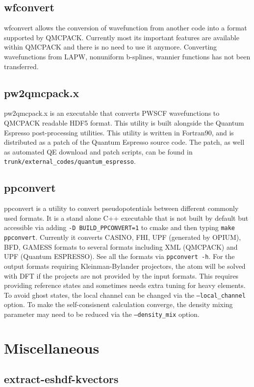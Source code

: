   \subsection{wfconvert}
    wfconvert allows the conversion of wavefunction from another code into a format supported by QMCPACK.
    Currently most its important features are available within QMCPACK and there is no need to use it anymore.
    Converting wavefunctions from LAPW, nonuniform b-splines, wannier functions has not been transferred.
  \subsection{pw2qmcpack.x}
    pw2qmcpack.x is an executable that converts PWSCF wavefunctions to QMCPACK readable 
    HDF5 format.  This utility is built alongside the Quantum Espresso post-processing utilities.
    This utility is written in Fortran90, and is distributed as a patch of the Quantum Espresso 
    source code.  The patch, as well as automated QE download and patch scripts, can be found in 
    \texttt{trunk/external\_codes/quantum\_espresso}.
  \subsection{ppconvert}
    ppconvert is a utility to convert pseudopotentials between different commonly used formats.
    It is a stand alone C++ executable that is not built by default but accessible via adding
    \texttt{-D BUILD\_PPCONVERT=1} to cmake and then typing \texttt{make ppconvert}.
    Currently it converts CASINO, FHI, UPF (generated by OPIUM), BFD, GAMESS formats to several formats
    including XML (QMCPACK) and UPF (Quantum ESPRESSO). See all the formats via \texttt{ppconvert -h}.
    For the output formats requiring Kleinman-Bylander projectors, the atom will be solved with DFT
    if the projects are not provided by the input formats.
    This requires providing reference states and sometimes needs extra tuning for heavy elements.
    To avoid ghost states, the local channel can be changed via the \texttt{--local\_channel} option.
    To make the self-consisnent calculation converge, the density mixing parameter may need to be reduced
    via the \texttt{--density\_mix} option.
\section{Miscellaneous}
  \subsection{extract-eshdf-kvectors}
    

